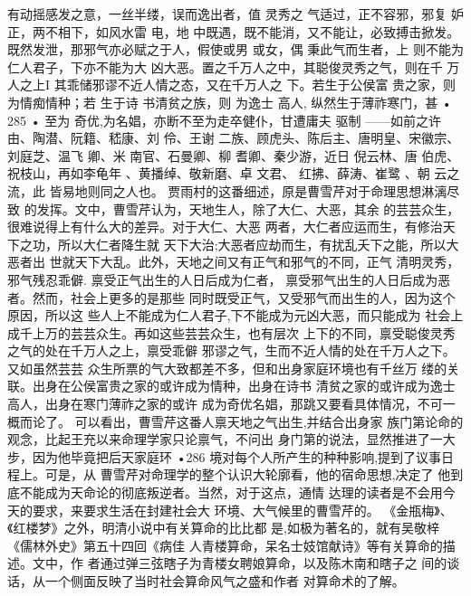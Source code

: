 有动摇感发之意，一丝半缕，误而逸出者，值 灵秀之
气适过，正不容邪，邪复 妒正，两不相下，如风水雷
电，地 中既遇，既不能消，又不能让，必致搏击掀发。
既然发泄，那邪气亦必赋之于人，假使或男 或女，偶
秉此气而生者，上 则不能为仁人君子，下亦不能为大
凶大恶。置之千万人之中，其聪俊灵秀之气，则在千
万人之上I 其乖储邪谬不近人情之态，又在千万人之
下。若生于公侯富 贵之家，则 为情痴情种；若 生于诗
书清贫之族，则 为逸士 高人, 纵然生于薄祚寒门，甚
• 285 •
至为 奇优,为名娼，亦断不至为走卒健仆，甘遭庸夫
驱制
——如前之许由、陶潜、阮籍、嵇康、刘 伶、王谢
二族、顾虎头、陈后主、唐明皇、宋徽宗、刘庭芝、温飞
卿、米 南官、石曼卿、柳 耆卿、秦少游，近日 倪云林、唐
伯虎、祝枝山，再如李龟年 、黄播绰、敬新磨、卓 文君、
红拂、薛涛、崔鹭 、朝 云之流，此 皆易地则同之人也。
贾雨村的这番细述，原是曹雪芹对于命理思想淋漓尽致
的发挥。文中，曹雪芹认为，天地生人，除了大仁、大恶，其余
的芸芸众生，很难说得上有什么大的差异。对于大仁、大恶
两者，大仁者应运而生，有修治天下之功，所以大仁者降生就
天下大治;大恶者应劫而生，有扰乱夭下之能，所以大恶者出
世就天下大乱。此外，天地之间又有正气和邪气的不同，正气
清明灵秀，邪气残忍乖僻. 禀受正气出生的人日后成为仁者，
禀受邪气出生的人日后成为恶者。然而，社会上更多的是那些
同时既受正气，又受邪气而出生的人，因为这个原因，所以这
些人上不能成为仁人君子,下不能成为元凶大恶，而只能成为
社会上成千上万的芸芸众生。再如这些芸芸众生，也有层次
上下的不同，禀受聪俊灵秀之气的处在千万人之上，禀受乖僻
邪谬之气，生而不近人情的处在千万人之下。又如虽然芸芸
众生所票的气大致都差不多，但和出身家庭环境也有千丝万
缕的关联。出身在公侯富贵之家的或许成为情种，出身在诗书
清贫之家的或许成为逸士高人，出身在寒门薄祚之家的或许
成为奇优名娼，那跳又要看具体情况，不可一概而论了。
可以看出，曹雪芹这番人禀天地之气出生,并结合出身家
族门第论命的观念，比起王充以来命理学家只论禀气，不问出
身门第的说法，显然推进了一大步，因为他毕竟把后天家庭环
•286
境对每个人所产生的种种影响,提到了议事日程上。可是，从
曹雪芹对命理学的整个认识大轮廓看，他的宿命思想,决定了
他到底不能成为天命论的彻底叛逆者。当然，对于这点，通情
达理的读者是不会用今天的要求，来要求生活在封建社会大
环境、大气候里的曹雪芹的。
《金瓶梅》、《红楼梦》之外，明清小说中有关算命的比比都
是,如极为著名的，就有吴敬梓《儒林外史》第五十四回《病佳
人青楼算命，呆名士妓馆献诗》等有关算命的描述。文中，作
者通过弹三弦瞎子为青楼女聘娘算命，以及陈木南和瞎子之
间的谈话，从一个侧面反映了当时社会算命风气之盛和作者
对算命术的了解。

